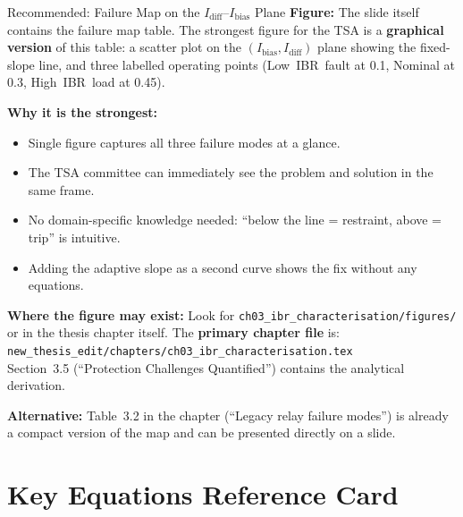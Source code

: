 \documentclass[12pt,a4paper]{article}
\newcommand{\Idiff}{I_\mathrm{diff}}
\newcommand{\Ibias}{I_\mathrm{bias}}
\begin{document}
\begin{resultbox}{Recommended: Failure Map on the $\Idiff$--$\Ibias$ Plane}
\textbf{Figure:} The slide itself contains the failure map table.  The strongest figure
for the TSA is a \textbf{graphical version} of this table: a scatter plot on the
$(\Ibias, \Idiff)$ plane showing the fixed-slope line, and three labelled operating
points (Low~IBR~fault at 0.1, Nominal at 0.3, High~IBR~load at 0.45).

\textbf{Why it is the strongest:}
\begin{itemize}[nosep]
  \item Single figure captures all three failure modes at a glance.
  \item The TSA committee can immediately see the problem and solution in the same frame.
  \item No domain-specific knowledge needed: ``below the line = restraint, above = trip''
        is intuitive.
  \item Adding the adaptive slope as a second curve shows the fix without any equations.
\end{itemize}

\textbf{Where the figure may exist:} Look for
\verb|ch03_ibr_characterisation/figures/| or in the thesis chapter itself.
The \textbf{primary chapter file} is:\\
\verb|new_thesis_edit/chapters/ch03_ibr_characterisation.tex|\\
Section~3.5 (``Protection Challenges Quantified'') contains the analytical derivation.

\textbf{Alternative:} Table~3.2 in the chapter (``Legacy relay failure modes'') is
already a compact version of the map and can be presented directly on a slide.
\end{resultbox}

\section{Key Equations Reference Card}
\end{document}
